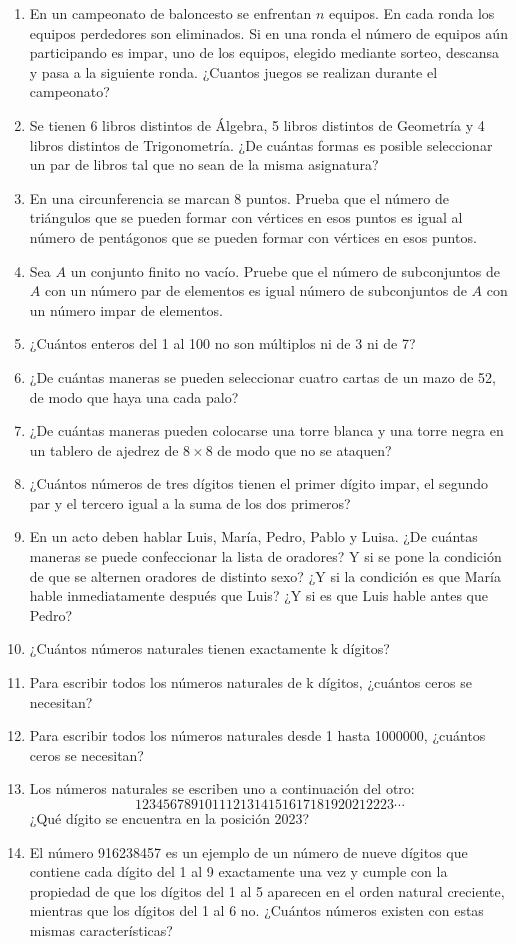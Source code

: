 \begin{enumerate}
    \item En un campeonato de baloncesto se enfrentan $n$ equipos. En cada ronda los equipos perdedores son eliminados. Si en una ronda el número de equipos aún participando es impar, uno de los equipos, elegido mediante sorteo, descansa y pasa a la siguiente ronda. ¿Cuantos juegos se realizan durante el campeonato?
    \item Se tienen 6 libros distintos de Álgebra, 5 libros distintos de Geometría y 4 libros distintos de Trigonometría. ¿De cuántas formas es posible seleccionar un par de libros tal que no sean de la misma asignatura?
    \item En una circunferencia se marcan 8 puntos. Prueba que el número de triángulos que se pueden formar con vértices en esos puntos es igual al número de pentágonos que se pueden formar con vértices en esos puntos.
    \item Sea $A$ un conjunto finito no vacío. Pruebe que el número de subconjuntos de $A$ con un número par de elementos es igual número de subconjuntos de $A$ con un número impar de elementos.
    \item ¿Cuántos enteros del 1 al 100 no son múltiplos ni de 3 ni de 7?
    \item ¿De cuántas maneras se pueden seleccionar cuatro cartas de un mazo de 52, de modo que haya una cada palo?
    \item ¿De cuántas maneras pueden colocarse una torre blanca y una torre negra en un tablero de
    ajedrez de $8\times 8$ de modo que no se ataquen?
    \item  ¿Cuántos números de tres dígitos tienen el primer dígito impar, el segundo par y el tercero igual a la suma de los dos primeros?
    \item En un acto deben hablar Luis, María, Pedro, Pablo y Luisa. ¿De cuántas maneras se puede confeccionar la lista de oradores? Y si se pone la condición de que se alternen oradores de distinto sexo? ¿Y si la condición es que María hable inmediatamente después que Luis? ¿Y si es que Luis hable antes que Pedro?
    \item ¿Cuántos números naturales tienen exactamente k dígitos?
    \item Para escribir todos los números naturales de k dígitos, ¿cuántos ceros se necesitan?
    \item Para escribir todos los números naturales desde 1 hasta 1000000, ¿cuántos ceros se necesitan?
    \item Los números naturales se escriben uno a continuación del otro: $$1234567891011121314151617181920212223\dotsb$$
    ¿Qué dígito se encuentra en la posición 2023?
    \item  El número 916238457 es un ejemplo de un número de nueve dígitos que contiene cada dígito del 1 al 9 exactamente una vez y cumple con la propiedad de que los dígitos del 1 al 5 aparecen en el orden natural creciente, mientras que los dígitos del 1 al 6 no. ¿Cuántos números existen con estas mismas características?
    
\end{enumerate}